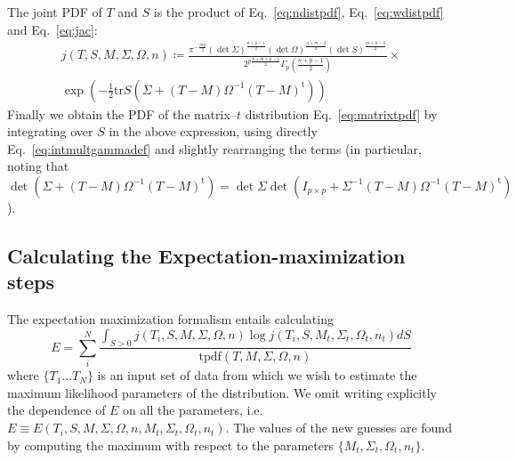 \documentclass[english,listof=totoc]{scrartcl}
\begin{document}
The joint PDF of $T$ and $S$ is the product of Eq.~\ref{eq:ndistpdf},
Eq.~\ref{eq:wdistpdf} and Eq.~\ref{eq:jac}:
\begin{equation}
\begin{split}j(T,S,M,\Sigma,\Omega,n)\coloneqq\frac{\pi^{-\frac{mp}{2}}(\det\Sigma)^{\frac{n+p-1}{2}}(\det\Omega)^{\frac{n+m-2}{2}}(\det S)^{\frac{m+n-2}{2}}}{2^{p\frac{n+m+p-1}{2}}\Gamma_{p}(\frac{n+p-1}{2})}\times\\
\exp\left(-\frac{1}{2}\textrm{tr}S(\Sigma+(T-M)\Omega^{-1}(T-M)^{\textrm{t}})\right)
\end{split}
\label{eq:jointpdf}
\end{equation}
Finally we obtain the PDF of the matrix--$t$ distribution Eq.~\ref{eq:matrixtpdf}
by integrating over $S$ in the above expression, using directly Eq.~\ref{eq:intmultgammadef}
and slightly rearranging the terms (in particular, noting that $\det(\Sigma+(T-M)\Omega^{-1}(T-M)^{\textrm{t}})=\det\Sigma\det(I_{p\times p}+\Sigma^{-1}(T-M)\Omega^{-1}(T-M)^{\textrm{t}})$).

\subsection{Calculating the Expectation-maximization steps}

The expectation maximization formalism entails calculating 
\begin{equation}
E=\sum_{i}^{N}\frac{\int_{S>0}j(T_{i},S,M,\Sigma,\Omega,n)\log j(T_{i},S,M_{t},\Sigma_{t},\Omega_{t},n_{t})dS}{\textrm{tpdf}(T,M,\Sigma,\Omega,n)}\label{eq:expdef}
\end{equation}
where $\{T_{1}...T_{N}\}$ is an input set of data from which we wish
to estimate the maximum likelihood parameters of the distribution.
We omit writing explicitly the dependence of $E$ on all the parameters,
i.e. $E\equiv E(T_{i},S,M,\Sigma,\Omega,n,M_{t},\Sigma_{t},\Omega_{t},n_{t})$.
The values of the new guesses are found by computing the maximum with
respect to the parameters $\{M_{t},\Sigma_{t},\Omega_{t},n_{t}\}$. 
\end{document}
